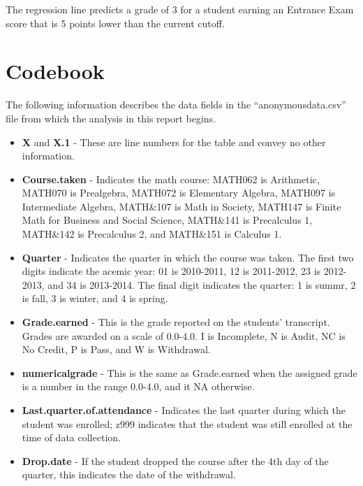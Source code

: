 \documentclass[twoside]{article}\usepackage[]{graphicx}\usepackage[]{color}
\begin{document}
The regression line predicts a grade of 3 for a student earning an Entrance Exam score that is 5 points lower than the current cutoff.



\newpage
\section{Codebook}

The following information describes the data fields in the ``anonymousdata.csv'' file from which the analysis in this report begins.


\begin{itemize}
\item {\bf X} and {\bf X.1} - These are line numbers for the table and convey no other information.


\item {\bf Course.taken} - Indicates the math course: MATH062 is Arithmetic, MATH070 is Prealgebra, MATH072 is Elementary Algebra, MATH097 is Intermediate Algebra, MATH\&107 is Math in Society, MATH147 is Finite Math for Business and Social Science, MATH\&141 is Precalculus 1, MATH\&142 is Precalculus 2, and MATH\&151 is Calculus 1.

\item {\bf Quarter} - Indicates the quarter in which the course was taken.  The first two digits indicate the acemic year: 01 is 2010-2011, 12 is 2011-2012, 23 is 2012-2013, and 34 is 2013-2014.  The final digit indicates the quarter: 1 is summr, 2 is fall, 3 is winter, and 4 is spring.

\item {\bf Grade.earned} - This is the grade reported on the students' transcript.  Grades are awarded on a scale of 0.0-4.0.  I is Incomplete, N is Audit, NC is No Credit, P is Pass, and W is Withdrawal.


\item {\bf numericalgrade} - This is the same as Grade.earned when the assigned grade is a number in the range 0.0-4.0, and it NA otherwise.

\item {\bf Last.quarter.of.attendance} - Indicates the last quarter during which the student was enrolled; z999 indicates that the student was still enrolled at the time of data collection.

\item {\bf Drop.date} - If the student dropped the course after the 4th day of the quarter, this indicates the date of the withdrawal.


\end{itemize}
\end{document}
